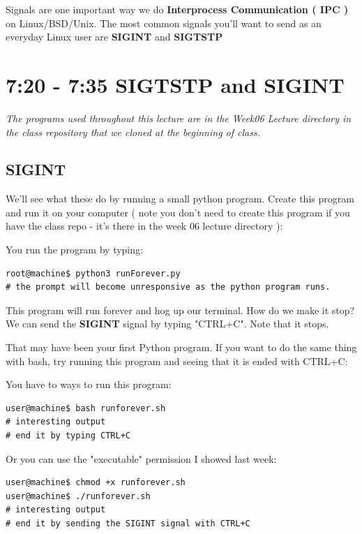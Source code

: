 \documentclass[12pt]{article}
\begin{document}
 Signals are one important way we do \textbf{Interprocess Communication ( IPC )} on
Linux/BSD/Unix. The most common signals you'll want to send as an everyday Linux
user are \textbf{SIGINT} and \textbf{SIGTSTP}

\section{7:20 - 7:35 SIGTSTP and SIGINT}

\textit{The programs used throughout this lecture are in the Week06 Lecture directory in
the class repository that we  cloned at the beginning of class. }

\subsection{SIGINT}
We'll see what these do by running a small python program. Create this program
and run it on your computer ( note you don't need to create this program if you
have the class repo - it's there in the week 06 lecture directory ):



You run the program by typing:

\begin{lstlisting}[style=term]
root@machine$ python3 runForever.py
# the prompt will become unresponsive as the python program runs.
\end{lstlisting}

This program will run forever and hog up our terminal. How do we make it stop? We can send the \textbf{SIGINT} signal by typing "CTRL+C". Note that it stops. 

That may have been your first Python program. If you want to do the same thing
with bash, try running this program and seeing that it is ended with CTRL+C:



You have to ways to run this program:

\begin{lstlisting}[style=term]
user@machine$ bash runforever.sh
# interesting output
# end it by typing CTRL+C
\end{lstlisting}

Or you can use the "executable" permission I showed last week:

\begin{lstlisting}[style=term]
user@machine$ chmod +x runforever.sh
user@machine$ ./runforever.sh
# interesting output
# end it by sending the SIGINT signal with CTRL+C
\end{lstlisting}
\end{document}
